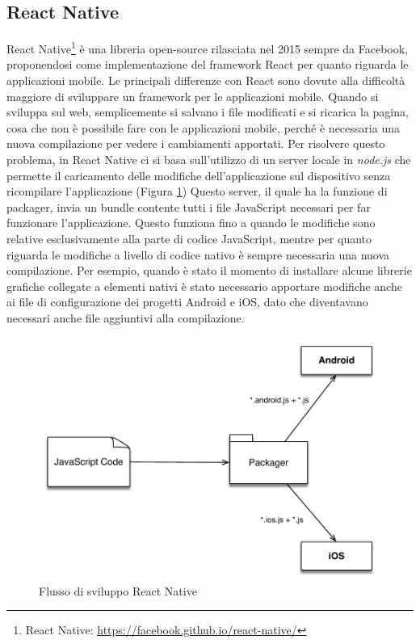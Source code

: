 \subsection{React Native}\label{sec:react-native}
React Native\footnote{React Native: \url{https://facebook.github.io/react-native/}} è una libreria open-source rilasciata nel 2015 sempre da Facebook, proponendosi come implementazione del framework React per quanto riguarda le applicazioni mobile.
Le principali differenze con React sono dovute alla difficoltà maggiore di sviluppare un framework per le applicazioni mobile. 
Quando si sviluppa sul web, semplicemente si salvano i file modificati e si ricarica la pagina, cosa che non è possibile fare con le applicazioni mobile, perché è necessaria una nuova compilazione per vedere i cambiamenti apportati.
Per risolvere questo problema, in React Native ci si basa sull'utilizzo di un server locale in \emph{node.js} che permette il caricamento delle modifiche dell'applicazione sul dispositivo senza ricompilare l'applicazione (Figura \ref{fig:flusso-sviluppo-react-native}) Questo server, il quale ha la funzione di packager, invia un bundle contente tutti i file JavaScript necessari per far funzionare l'applicazione. Questo funziona fino a quando le modifiche sono relative esclusivamente alla parte di codice JavaScript, mentre per quanto riguarda le modifiche a livello di codice nativo è sempre necessaria una nuova compilazione. Per esempio, quando è stato il momento di installare alcune librerie grafiche collegate a elementi nativi è stato necessario apportare modifiche anche ai file di configurazione dei progetti Android e iOS, dato che diventavano necessari anche file aggiuntivi alla compilazione.

\begin{figure}[ht]
	\centering
	\includegraphics[width=\textwidth]{6-implementazione-app/immagini/flusso-sviluppo-react-native.pdf}
	\caption{Flusso di sviluppo React Native\label{fig:flusso-sviluppo-react-native}}
\end{figure}

